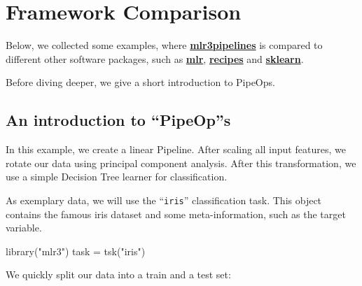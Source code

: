 \documentclass[
]{scrbook}
\newenvironment{Shaded}{\begin{snugshade}}{\end{snugshade}}
\newcommand{\CommentTok}[1]{\textcolor[rgb]{0.56,0.35,0.01}{\textit{#1}}}
\newcommand{\DecValTok}[1]{\textcolor[rgb]{0.00,0.00,0.81}{#1}}
\newcommand{\FunctionTok}[1]{\textcolor[rgb]{0.00,0.00,0.00}{#1}}
\newcommand{\NormalTok}[1]{#1}
\newcommand{\OtherTok}[1]{\textcolor[rgb]{0.56,0.35,0.01}{#1}}
\newcommand{\SpecialCharTok}[1]{\textcolor[rgb]{0.00,0.00,0.00}{#1}}
\newcommand{\StringTok}[1]{\textcolor[rgb]{0.31,0.60,0.02}{#1}}
\renewenvironment{Shaded} {\begin{snugshade}\small} {\end{snugshade}}
\begin{document}
\hypertarget{compare-frameworks}{%
\section{Framework Comparison}\label{compare-frameworks}}

Below, we collected some examples, where \textbf{\href{https://cran.r-project.org/package=mlr3pipelines}{mlr3pipelines}} is compared to different other software packages,
such as \textbf{\href{https://cran.r-project.org/package=mlr}{mlr}}, \textbf{\href{https://cran.r-project.org/package=recipes}{recipes}} and \textbf{\href{https://scikit-learn.org/stable/}{sklearn}}.

Before diving deeper, we give a short introduction to PipeOps.

\hypertarget{an-introduction-to-pipeops}{%
\subsection{An introduction to ``PipeOp''s}\label{an-introduction-to-pipeops}}

In this example, we create a linear Pipeline.
After scaling all input features, we rotate our data using principal component analysis.
After this transformation, we use a simple Decision Tree learner for classification.

As exemplary data, we will use the ``\texttt{iris}'' classification task.
This object contains the famous iris dataset and some meta-information, such as the target variable.

\begin{Shaded}
\begin{Highlighting}[]
\FunctionTok{library}\NormalTok{(}\StringTok{"mlr3"}\NormalTok{)}
\NormalTok{task }\OtherTok{=} \FunctionTok{tsk}\NormalTok{(}\StringTok{"iris"}\NormalTok{)}
\end{Highlighting}
\end{Shaded}

We quickly split our data into a train and a test set:

\begin{Shaded}
\end{Shaded}
\end{document}
